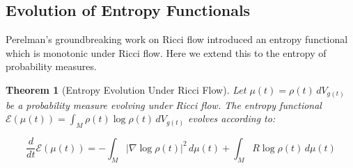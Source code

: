 \documentclass[12pt,a4paper]{article}
\newtheorem{theorem}{Theorem}
\begin{document}
\subsection{Evolution of Entropy Functionals}

Perelman's groundbreaking work on Ricci flow introduced an entropy functional which is monotonic under Ricci flow. Here we extend this to the entropy of probability measures.

\begin{theorem}[Entropy Evolution Under Ricci Flow]
Let $\mu(t) = \rho(t) \, dV_{g(t)}$ be a probability measure evolving under Ricci flow. The entropy functional $\mathcal{E}(\mu(t)) = \int_M \rho(t) \log \rho(t) \, dV_{g(t)}$ evolves according to:

\begin{equation}
\frac{d}{dt}\mathcal{E}(\mu(t)) = -\int_M |\nabla \log \rho(t)|^2 \, d\mu(t) + \int_M R \log \rho(t) \, d\mu(t)
\end{equation}
\end{theorem}
\end{document}

